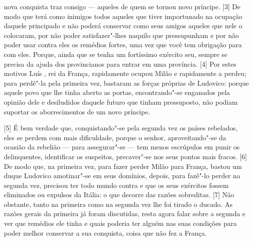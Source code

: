 nova conquista traz consigo --- aqueles de quem se tornou novo príncipe.
{[}3{]} De modo que terá como inimigos todos aqueles que tiver
importunado na ocupação daquele principado e não poderá conservar como
seus amigos aqueles que nele o colocaram, por não poder satisfazer"-lhes
naquilo que pressupunham e por não poder usar contra eles os remédios
fortes, uma vez que você tem obrigação para com eles. Porque, ainda que
se tenha um fortíssimo exército seu, sempre se precisa da ajuda dos
provincianos para entrar em uma província.
{[}4{]} Por estes motivos Luís , rei da França,
rapidamente ocupou Milão e rapidamente a perdeu; para perdê"-la pela
primeira vez, bastaram as forças próprias de Ludovico: porque aquele
povo que lhe tinha aberto as portas, encontrando"-se enganados pela
opinião dele e desiludidos daquele futuro que tinham pressuposto, não
podiam suportar os aborrecimentos de um novo príncipe.

{[}5{]} É bem verdade que, conquistando"-se pela segunda vez os países
rebelados, eles se perdem com mais dificuldade, porque o senhor,
aproveitando"-se da ocasião da rebelião --- para assegurar"-se --- tem menos
escrúpulos em punir os delinquentes, identificar os suspeitos,
precaver"-se nos seus pontos mais fracos. {[}6{]} De modo que, na
primeira vez, para fazer perder Milão para França, bastou um duque
Ludovico amotinar"-se em seus domínios, depois, para fazê"-lo perder na
segunda vez, precisou ter todo mundo contra e que os
seus exércitos fossem eliminados ou expulsos da Itália: o que decorre
das razões sobreditas. {[}7{]} Não obstante, tanto na primeira como na
segunda vez lhe foi tirado o ducado. As razões gerais da primeira já
foram discutidas, resta agora falar sobre a segunda e ver que remédios
ele tinha e quais poderia ter alguém nas suas
condições para poder melhor conservar a sua conquista, coisa que não fez
a França.


